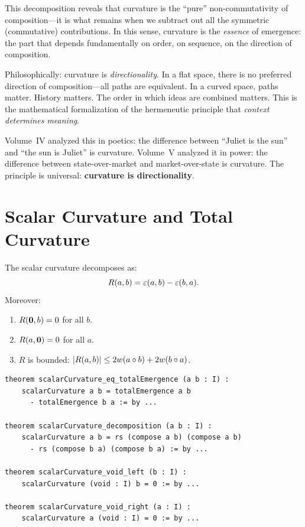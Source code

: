 \begin{interpretation}
This decomposition reveals that curvature is the ``pure'' non-commutativity
of composition---it is what remains when we subtract out all the symmetric
(commutative) contributions. In this sense, curvature is the \emph{essence}
of emergence: the part that depends fundamentally on order, on sequence, on
the direction of composition.

Philosophically: curvature is \emph{directionality}. In a flat space, there
is no preferred direction of composition---all paths are equivalent. In a
curved space, paths matter. History matters. The order in which ideas are
combined matters. This is the mathematical formalization of the hermeneutic
principle that \emph{context determines meaning}.

Volume~IV analyzed this in poetics: the difference between ``Juliet is the
sun'' and ``the sun is Juliet'' is curvature. Volume~V analyzed it in power:
the difference between state-over-market and market-over-state is curvature.
The principle is universal: \textbf{curvature is directionality}.
\end{interpretation}


\section{Scalar Curvature and Total Curvature}

\begin{theorem}
\label{thm:scalar-decomposition}
The scalar curvature decomposes as:
\[
  R(a, b) = \varepsilon(a, b) - \varepsilon(b, a).
\]
Moreover:
\begin{enumerate}
  \item $R(\mathbf{0}, b) = 0$ for all $b$.
  \item $R(a, \mathbf{0}) = 0$ for all $a$.
  \item $R$ is bounded: $|R(a,b)| \leq 2w(a \circ b) + 2w(b \circ a)$.
\end{enumerate}
\end{theorem}

\begin{lstlisting}[caption={Scalar curvature (IDT\_v3\_Emergence.lean)}]
theorem scalarCurvature_eq_totalEmergence (a b : I) :
    scalarCurvature a b = totalEmergence a b
      - totalEmergence b a := by ...

theorem scalarCurvature_decomposition (a b : I) :
    scalarCurvature a b = rs (compose a b) (compose a b)
      - rs (compose b a) (compose b a) := by ...

theorem scalarCurvature_void_left (b : I) :
    scalarCurvature (void : I) b = 0 := by ...

theorem scalarCurvature_void_right (a : I) :
    scalarCurvature a (void : I) = 0 := by ...
\end{lstlisting}


